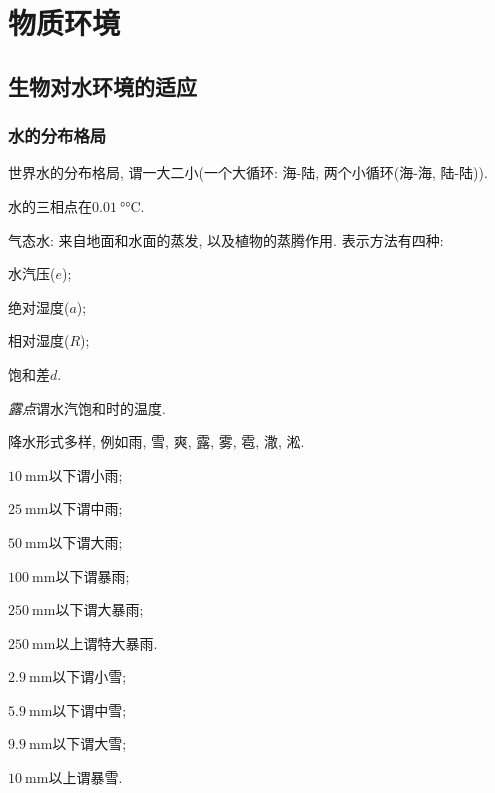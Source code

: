 \documentclass{ctexart}
\begin{document}
\section{物质环境} %
\label{sec:物质环境}

\subsection{生物对水环境的适应} %
\label{sub:生物对水环境的适应}

\subsubsection{水的分布格局} %
\label{ssub:水的分布格局}

世界水的分布格局, 谓一大二小(一个大循环: 海-陆, 两个小循环(海-海, 陆-陆)).
\par
水的三相点在$\SI{0.01}{\degree\celsius}$.
\begin{cenum}
    \item 气态水: 来自地面和水面的蒸发, 以及植物的蒸腾作用. 表示方法有四种:
    \begin{cenum}
        \item 水汽压($e$);
        \item 绝对湿度($a$);
        \item 相对湿度($R$);
        \item 饱和差$d$.
    \end{cenum}
    \emph{露点}谓水汽饱和时的温度.
\end{cenum}
降水形式多样, 例如雨, 雪, 爽, 露, 雾, 雹, 潵, 淞.
\begin{cenum}
    \item $\SI{10}{\milli\meter}$以下谓小雨;
    \item $\SI{25}{\milli\meter}$以下谓中雨;
    \item $\SI{50}{\milli\meter}$以下谓大雨;
    \item $\SI{100}{\milli\meter}$以下谓暴雨;
    \item $\SI{250}{\milli\meter}$以下谓大暴雨;
    \item $\SI{250}{\milli\meter}$以上谓特大暴雨.
\end{cenum}
\begin{cenum}
    \item $\SI{2.9}{\milli\meter}$以下谓小雪;
    \item $\SI{5.9}{\milli\meter}$以下谓中雪;
    \item $\SI{9.9}{\milli\meter}$以下谓大雪;
    \item $\SI{10}{\milli\meter}$以上谓暴雪.
\end{cenum}
\end{document}
